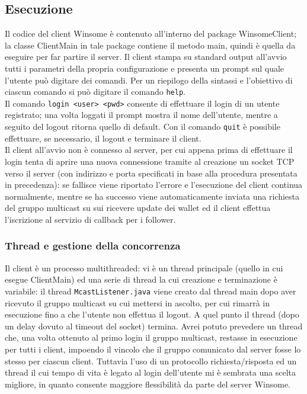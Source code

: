 \subsection{Esecuzione}
Il codice del client Winsome è contenuto all'interno del package WinsomeClient; la classe ClientMain in tale package contiene il metodo main, quindi è quella da eseguire per far partire il server. Il client stampa su standard output all'avvio tutti i parametri della propria configurazione e presenta un prompt sul quale l'utente può digitare dei comandi. Per un riepilogo della sintassi e l'obiettivo di ciascun comando si può digitare il comando \verb|help|.\\
Il comando \verb|login <user> <pwd>| consente di effettuare il login di un utente registrato; una volta loggati il prompt mostra il nome dell'utente, mentre a seguito del logout ritorna quello di default. Con il comando \verb|quit| è possibile effettuare, se necessario, il logout e terminare il client.\\
Il client all'avvio non è connesso al server, per cui appena prima di effettuare il login tenta di aprire una nuova connessione tramite al creazione un socket TCP verso il server (con indirizzo e porta specificati in base alla procedura presentata in precedenza): se fallisce viene riportato l'errore e l'esecuzione del client continua normalmente, mentre se ha successo viene automaticamente inviata una richiesta del gruppo multicast su sui ricevere update dei wallet ed il client effettua l'iscrizione al servizio di callback per i follower.

\subsubsection{Thread e gestione della concorrenza}
Il client è un processo multithreaded: vi è un thread principale (quello in cui esegue ClientMain) ed una serie di thread la cui creazione e terminazione è variabile: il thread \verb|McastListener.java| viene creato dal thread main dopo aver ricevuto il gruppo multicast su cui mettersi in ascolto, per cui rimarrà in esecuzione fino a che l'utente non effettua il logout. A quel punto il thread (dopo un delay dovuto al timeout del socket) termina. Avrei potuto prevedere un thread che, una volta ottenuto al primo login il gruppo multicast, restasse in esecuzione per tutti i client, impoendo il vincolo che il gruppo comunicato dal server fosse lo stesso per ciascun client. Tuttavia l'uso di un protocollo richiesta/risposta ed un thread il cui tempo di vita è legato al login dell'utente mi è sembrata una scelta migliore, in quanto consente maggiore flessibilità da parte del server Winsome.\\

